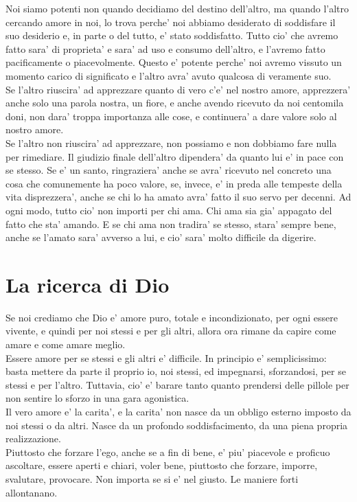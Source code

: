 Noi siamo potenti non quando decidiamo del destino dell'altro, ma quando l'altro cercando amore in noi, lo trova perche' noi abbiamo desiderato di soddisfare il suo desiderio e, in parte o del tutto, e' stato soddisfatto. Tutto cio' che avremo fatto sara' di proprieta' e sara' ad uso e consumo dell'altro, e l'avremo fatto pacificamente o piacevolmente. Questo e' potente perche' noi avremo vissuto un momento carico di significato e l'altro avra' avuto qualcosa di veramente suo.\\

Se l'altro riuscira' ad apprezzare quanto di vero c'e' nel nostro amore, apprezzera' anche solo una parola nostra, un fiore, e anche avendo ricevuto da noi centomila doni, non dara' troppa importanza alle cose, e continuera' a dare valore solo al nostro amore. \\
Se l'altro non riuscira' ad apprezzare, non possiamo e non dobbiamo fare nulla per rimediare. Il giudizio finale dell'altro dipendera' da quanto lui e' in pace con se stesso. Se e' un santo, ringraziera' anche se avra' ricevuto nel concreto una cosa che comunemente ha poco valore, se, invece, e' in preda alle tempeste della vita disprezzera', anche se chi lo ha amato avra' fatto il suo servo per decenni. Ad ogni modo, tutto cio' non importi per chi ama. Chi ama sia gia' appagato del fatto che sta' amando. E se chi ama non tradira' se stesso, stara' sempre bene, anche se l'amato sara' avverso a lui, e cio' sara' molto difficile da digerire. \\

\section{La ricerca di Dio}
Se noi crediamo che Dio e' amore puro, totale e incondizionato, per ogni essere vivente, e quindi per noi stessi e per gli altri, allora ora rimane da capire come amare e come amare meglio.\\

Essere amore per se stessi e gli altri e' difficile. In principio e' semplicissimo: basta mettere da parte il proprio io, noi stessi, ed impegnarsi, sforzandosi, per se stessi e per l'altro. Tuttavia, cio' e' barare tanto quanto prendersi delle pillole per non sentire lo sforzo in una gara agonistica.\\
Il vero amore e' la carita', e la carita' non nasce da un obbligo esterno imposto da noi stessi o da altri. Nasce da un profondo soddisfacimento, da una piena propria realizzazione.\\
Piuttosto che forzare l'ego, anche se a fin di bene, e' piu' piacevole e proficuo ascoltare, essere aperti e chiari, voler bene, piuttosto che forzare, imporre, svalutare, provocare. Non importa se si e' nel giusto. Le maniere forti allontanano.

